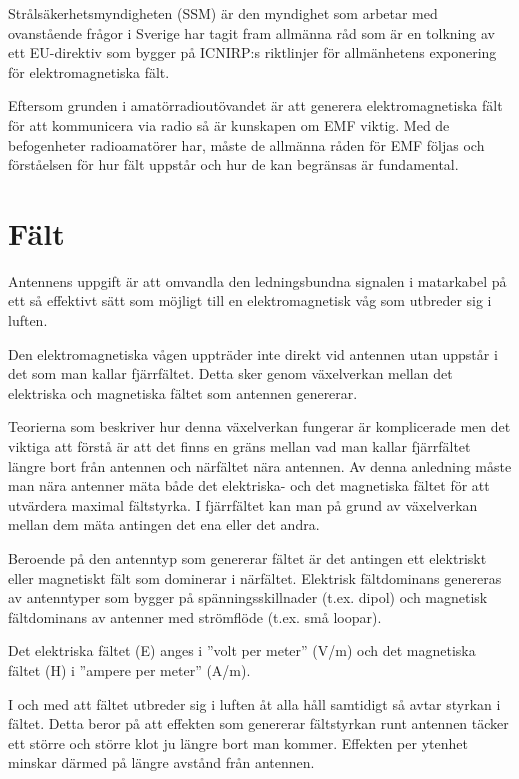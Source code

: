 Strålsäkerhetsmyndigheten (SSM) är den myndighet som arbetar med
ovanstående frågor i Sverige har tagit fram allmänna råd som är
en tolkning av ett EU-direktiv som bygger på ICNIRP:s riktlinjer för
allmänhetens exponering för elektromagnetiska fält.

Eftersom grunden i amatörradioutövandet är att generera
elektromagnetiska fält för att kommunicera via radio så är kunskapen
om EMF viktig. Med de befogenheter radioamatörer har, måste de
allmänna råden för EMF följas och förståelsen för hur fält uppstår
och hur de kan begränsas är fundamental.

\section{Fält}
Antennens uppgift är att omvandla den ledningsbundna signalen i
matarkabel på ett så effektivt sätt som möjligt till en
elektromagnetisk våg som utbreder sig i luften.

Den elektromagnetiska vågen uppträder inte direkt vid antennen utan
uppstår i det som man kallar fjärrfältet. Detta sker genom växelverkan
mellan det elektriska och magnetiska fältet som antennen genererar.

Teorierna som beskriver hur denna växelverkan fungerar är komplicerade
men det viktiga att förstå är att det finns en gräns mellan vad man
kallar fjärrfältet längre bort från antennen och närfältet nära
antennen. Av denna anledning måste man nära antenner mäta både det
elektriska- och det magnetiska fältet för att utvärdera maximal fältstyrka.
I fjärrfältet kan man på grund av växelverkan mellan dem
mäta antingen det ena eller det andra.

Beroende på den antenntyp som genererar fältet är det antingen ett
elektriskt eller magnetiskt fält som dominerar i närfältet.
Elektrisk fältdominans genereras av antenntyper som bygger på
spänningsskillnader (t.ex. dipol) och magnetisk fältdominans av antenner
med strömflöde (t.ex. små loopar).

Det elektriska fältet (E) anges i ''volt per meter'' (V/m) och det
magnetiska fältet (H) i ''ampere per meter'' (A/m).

I och med att fältet utbreder sig i luften åt alla håll samtidigt så
avtar styrkan i fältet. Detta beror på att effekten som genererar
fältstyrkan runt antennen täcker ett större och större klot ju
längre bort man kommer. Effekten per ytenhet minskar därmed på
längre avstånd från antennen.

